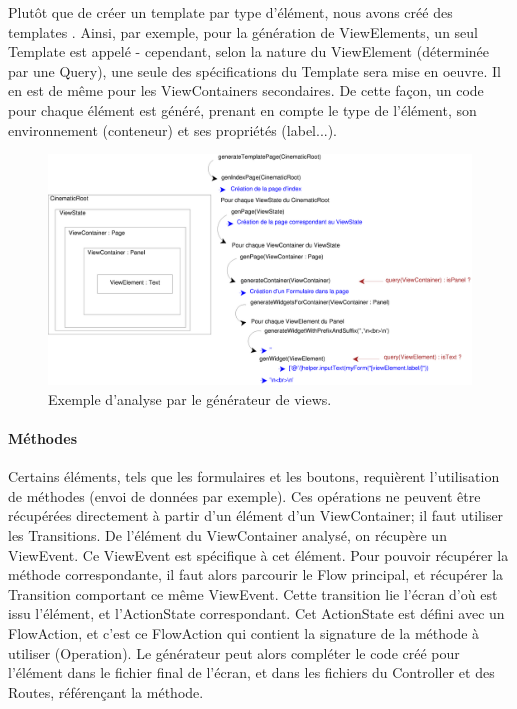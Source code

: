 Plutôt que de créer un template par type d'élément, nous avons créé des templates . Ainsi, par exemple, pour la génération de ViewElements, un seul Template est appelé - cependant, selon la nature du ViewElement (déterminée par une Query), une seule des spécifications du Template sera mise en oeuvre. Il en est de même pour les ViewContainers secondaires. De cette façon, un code  pour chaque élément est généré, prenant en compte le type de l'élément, son environnement (conteneur) et ses propriétés (label...).
\newline
\begin{figure}[H]
  \centering
  \includegraphics[scale=.35]{img/viewexample.eps}
  \caption{Exemple d'analyse par le générateur de views.}
  \label{fig: exemple generateur view}
\end{figure}
\paragraph{Méthodes}
Certains éléments, tels que les formulaires et les boutons, requièrent l'utilisation de méthodes (envoi de données par exemple). Ces opérations ne peuvent être récupérées directement à partir d'un élément d'un ViewContainer; il faut utiliser les Transitions. 
\newline
De l'élément du ViewContainer analysé, on récupère un ViewEvent. Ce ViewEvent est spécifique à cet élément. Pour pouvoir récupérer la méthode correspondante, il faut alors parcourir le Flow principal, et récupérer la Transition comportant ce même ViewEvent. Cette transition lie l'écran d'où est issu l'élément, et l'ActionState correspondant. Cet ActionState est défini avec un FlowAction, et c'est ce FlowAction qui contient la signature de la méthode à utiliser (Operation). Le générateur peut alors compléter le code créé pour l'élément dans le fichier final de l'écran, et dans les fichiers du Controller et des Routes, référençant la méthode.


